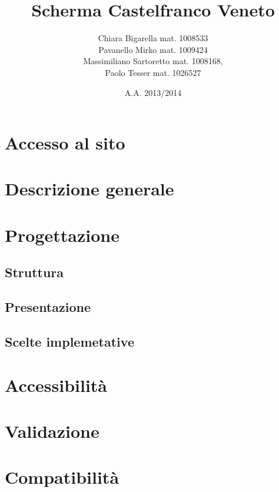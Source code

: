 
	
\title{\bfseries Scherma Castelfranco Veneto}
\author{Chiara Bigarella mat. 1008533\\Pavanello Mirko mat. 1009424 \\Massimiliano Sartoretto mat. 1008168,\\ Paolo Tesser mat. 1026527}
\date{A.A. 2013/2014}



\pagestyle{romano}
\newpage
	\tableofcontents
	\listoffigures
\newpage
{}
\pagestyle{std}


\newpage
\section{Accesso al sito}
	

\section{Descrizione generale}
	
	
\newpage
\section{Progettazione}
	\subsection{Struttura}
		
	\subsection{Presentazione}
		
	\subsection{Scelte implemetative}
		
\newpage
\section{Accessibilit\`a}
		

\newpage
\section{Validazione}
		

\newpage
\section{Compatibilit\`a}
	
	
